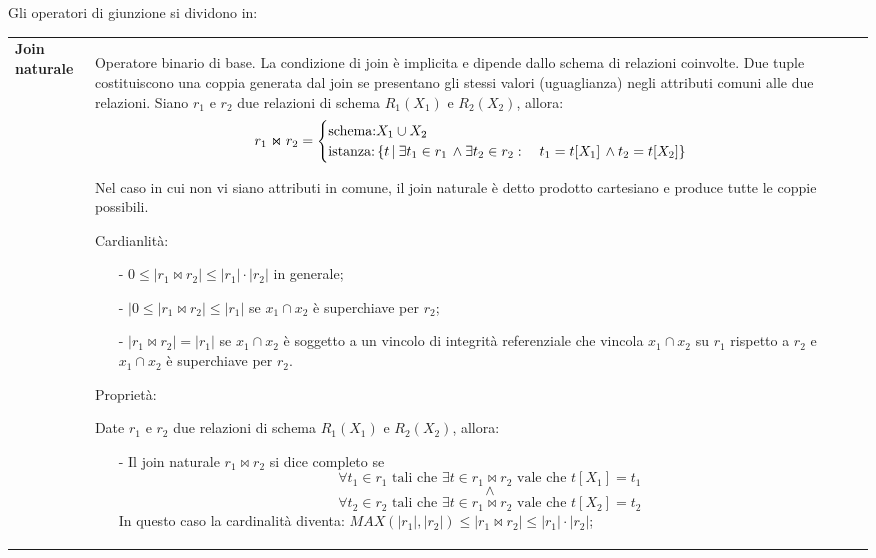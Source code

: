 \documentclass[a4paper, 10pt]{report}
\begin{document}
\noindent Gli operatori di giunzione si dividono in:
\begin{longtable}{| p{} | p{} |}
\textbf{Join naturale} & Operatore binario di base. La condizione di join è implicita e dipende dallo schema di relazioni coinvolte. Due tuple costituiscono una coppia generata dal join se presentano gli stessi valori (uguaglianza) negli attributi comuni alle due relazioni.
\newline
\newline
Siano $r_1$ e $r_2$ due relazioni di schema $R_1(X_1)$ e $R_2(X_2)$, allora:
\begin{align*}
r_1 \Join r_2 = 
				\begin{cases}
					\textup{schema:} X_1 \cup X_2 \\
					\textup{istanza:} \, \{ t\, | \: \exists t_1 \in r_1 \, \wedge \exists t_2 \in r_2 : \quad
						t_1 = t[X_1] \, \wedge t_2 = t [X_2]  \} 
				\end{cases}
\end{align*}

Nel caso in cui non vi siano attributi in comune, il join naturale è detto prodotto cartesiano e produce tutte le coppie possibili.
\newline

Cardianlità: 
\begin{itemize}
\item[-] \textbf{$0 \le |r_1 \Join r_2| \le |r_1| \cdot |r_2|$    } in generale;
\item[-] \textbf{$|0 \le |r_1 \Join r_2| \le |r_1|$} se $x_1 \cap x_2$ è superchiave per $r_2$;
\item[-] \textbf{$|r_1 \Join r_2| = |r_1|$} se $x_1 \cap x_2$ è soggetto a un vincolo di integrità referenziale che vincola $x_1 \cap x_2$ su $r_1$ rispetto a $r_2$ e $x_1 \cap x_2$ è superchiave per $r_2$.
\end{itemize}

Proprietà:
\newline

Date $r_1$ e $r_2$ due relazioni di schema $R_1(X_1)$ e $R_2(X_2)$, allora:
\begin{itemize}
\item[-] Il join naturale $r_1 \Join r_2$ si dice completo se $$\forall t_1 \in r_1 \text{ tali che } \exists t \in r_1 \Join r_2 \text{ vale che } t[X_1] = t_1 $$ $$\wedge$$ $$\forall t_2 \in r_2 \text{ tali che } \exists t \in r_1 \Join r_2 \text{ vale che } t[X_2] = t_2 $$
In questo caso la cardinalità diventa: $MAX(|r_1|, |r_2|) \le |r_1 \Join r_2| \le |r_1| \cdot |r_2|$;
\end{itemize}
\end{longtable}
\end{document}
